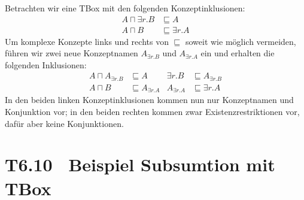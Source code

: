 \documentclass[fontsize=11pt, twoside=false, numbers=autoenddot]{scrbook}
\begin{document}
Betrachten wir eine TBox mit den folgenden Konzeptinklusionen: 
%
\begin{align*}
  A\sqcap \exists r.B & \sqsubseteq A \\
  A\sqcap B & \sqsubseteq \exists r.A 
\end{align*}
%
Um komplexe Konzepte links und rechts von $\sqsubseteq$ soweit
wie möglich vermeiden, führen wir zwei neue Konzeptnamen $A_{\exists
r.B}$ und $A_{\exists r.A}$ ein und erhalten die folgenden Inklusionen: 
%
\begin{align*}
  A\sqcap A_{\exists r.B} & \sqsubseteq A  & \exists r.B &
  \sqsubseteq A_{\exists r.B} \\
  A\sqcap B & \sqsubseteq A_{\exists r.A} & A_{\exists r.A} &\sqsubseteq
  \exists r.A
\end{align*}
%
In den beiden linken Konzeptinklusionen kommen nun nur Konzeptnamen
und Konjunktion vor; in den beiden rechten kommen zwar
Existenzrestriktionen vor, dafür aber keine Konjunktionen.

\section*{T6.10~ Beispiel Subsumtion mit TBox}
\end{document}
